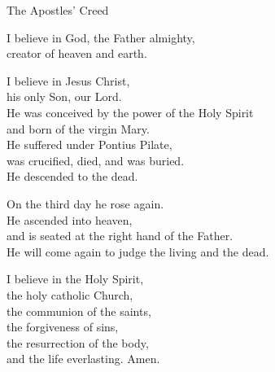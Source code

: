 \begin{bibletext}{The Apostles' Creed}
    \songtextsize
    \begin{verseframe}
        I believe in God, the Father almighty, \\
        creator of heaven and earth.
    \end{verseframe}

    \begin{verseframe}
        I believe in Jesus Christ, \\
        his only Son, our Lord. \\
        He was conceived by the power of the Holy Spirit \\
        and born of the virgin Mary. \\
        He suffered under Pontius Pilate, \\
        was crucified, died, and was buried. \\
        He descended to the dead.
    \end{verseframe}

    \begin{verseframe}
        On the third day he rose again. \\
        He ascended into heaven, \\
        and is seated at the right hand of the Father. \\
        He will come again to judge the living and the dead.
    \end{verseframe}

    \begin{verseframe}
        I believe in the Holy Spirit, \\
        the holy catholic Church, \\
        the communion of the saints, \\
        the forgiveness of sins, \\
        the resurrection of the body, \\
        and the life everlasting. Amen.
    \end{verseframe}
\end{bibletext}
\endinput
